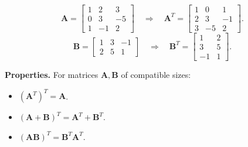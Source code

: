 \begin{example}
  \[
    \mathbf{A} =
    \begin{bmatrix}
      1 & 2 & 3 \\ 0 & 3 & -5 \\ 1 & -1 & 2
    \end{bmatrix}
    \quad\Longrightarrow\quad
    \mathbf{A}^T =
    \begin{bmatrix}
      1 & 0 & 1 \\ 2 & 3 & -1 \\ 3 & -5 & 2
    \end{bmatrix}
    .
  \]
  \[
    \mathbf{B} =
    \begin{bmatrix}
      1 & 3 & -1 \\ 2 & 5 & 1
    \end{bmatrix}
    \quad\Longrightarrow\quad
    \mathbf{B}^T =
    \begin{bmatrix}
      1 & 2 \\ 3 & 5 \\ -1 & 1
    \end{bmatrix}
    .
  \]
\end{example}

\textbf{Properties.} For matrices $\mathbf{A}, \mathbf{B}$ of compatible sizes:
\begin{itemize}
  \item $(\mathbf{A}^T)^T = \mathbf{A}$.
  \item $(\mathbf{A} + \mathbf{B})^T = \mathbf{A}^T + \mathbf{B}^T$.
  \item $(\mathbf{A}\mathbf{B})^T = \mathbf{B}^T \mathbf{A}^T$.
\end{itemize}

